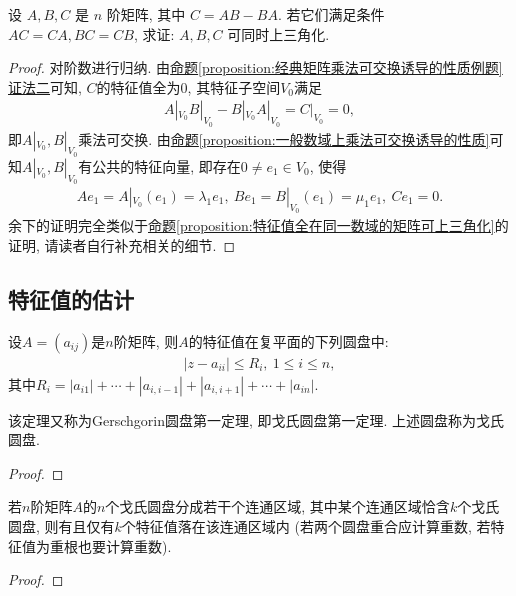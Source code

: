 \documentclass[../../main.tex]{subfiles}
\begin{document}
\begin{corollary}\label{proposition:经典矩阵乘法可交换诱导的性质例题推论}
设 \(A, B, C\) 是 \(n\) 阶矩阵, 其中 \(C = AB - BA\). 若它们满足条件 \(AC = CA, BC = CB\), 求证: \(A,B,C\) 可同时上三角化.
\end{corollary}
\begin{proof}
对阶数进行归纳. 由\hyperref[proposition:经典矩阵乘法可交换诱导的性质例题]{命题\ref{proposition:经典矩阵乘法可交换诱导的性质例题}证法二}可知, \(C\)的特征值全为\(0\), 其特征子空间\(V_{0}\)满足
\begin{align*}
A|_{V_{0}}B|_{V_{0}} - B|_{V_{0}}A|_{V_{0}}=C|_{V_{0}} = 0,
\end{align*}
即\(A|_{V_{0}},B|_{V_{0}}\)乘法可交换. 由\hyperref[proposition:一般数域上乘法可交换诱导的性质]{命题\ref{proposition:一般数域上乘法可交换诱导的性质}}可知\(A|_{V_{0}},B|_{V_{0}}\)有公共的特征向量, 即存在\(0\neq e_{1} \in V_{0}\), 使得
\begin{align*}
Ae_{1}=A|_{V_{0}}(e_{1})=\lambda_{1}e_{1},\ Be_{1}=B|_{V_{0}}(e_{1})=\mu_{1}e_{1},\ Ce_{1}=0.
\end{align*}
余下的证明完全类似于\hyperref[proposition:特征值全在同一数域的矩阵可上三角化]{命题\ref{proposition:特征值全在同一数域的矩阵可上三角化}}的证明, 请读者自行补充相关的细节.
\end{proof}

\subsection{特征值的估计}

\begin{theorem}[第一圆盘定理]\label{theorem:第一圆盘定理}
设\(A = (a_{ij})\)是\(n\)阶矩阵, 则\(A\)的特征值在复平面的下列圆盘中:
\begin{align*}
|z - a_{ii}| \leqslant  R_{i},\ 1 \leqslant  i \leqslant  n,
\end{align*}
其中\(R_{i} = |a_{i1}| + \cdots + |a_{i,i - 1}| + |a_{i,i + 1}| + \cdots + |a_{in}|\).
\end{theorem}
\begin{remark}
该定理又称为Gerschgorin圆盘第一定理, 即戈氏圆盘第一定理. 上述圆盘称为戈氏圆盘.
\end{remark}
\begin{proof}

\end{proof}

\begin{theorem}[第二圆盘定理]\label{theorem:第二圆盘定理}
若\(n\)阶矩阵\(A\)的\(n\)个戈氏圆盘分成若干个连通区域, 其中某个连通区域恰含\(k\)个戈氏圆盘, 则有且仅有\(k\)个特征值落在该连通区域内 (若两个圆盘重合应计算重数, 若特征值为重根也要计算重数).
\end{theorem}
\begin{proof}

\end{proof}
\end{document}
